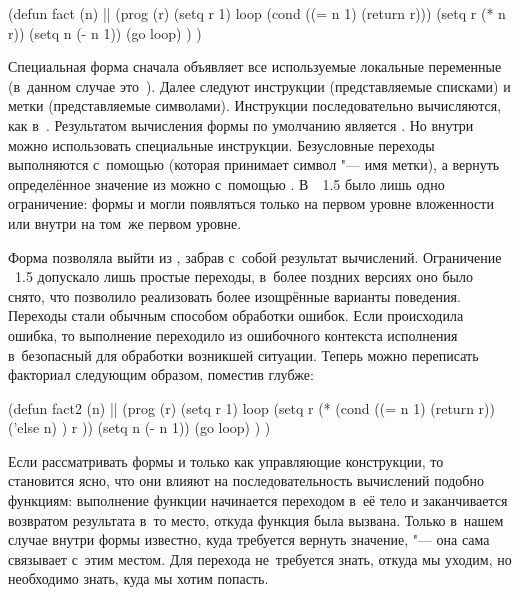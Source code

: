 \begin{code:lisp}
(defun fact (n)     |\dialect{\CommonLisp}|
  (prog (r)
            (setq r 1)
       loop (cond ((= n 1) (return r)))
            (setq r (* n r))
            (setq n (- n 1))
            (go loop) ) )
\end{code:lisp}

Специальная форма  сначала объявляет все используемые локальные
переменные (в~данном случае это~). Далее следуют инструкции
(представляемые списками) и метки (представляемые символами). Инструкции
последовательно вычисляются, как в~. Результатом вычисления формы
 по умолчанию является . Но внутри  можно использовать
специальные инструкции. Безусловные переходы выполняются с~помощью 
(которая принимает символ "--- имя метки), а вернуть определённое значение из
 можно с~помощью . В~\LISP~1.5 было лишь одно ограничение:
формы  и  могли появляться только на первом уровне вложенности
или внутри  на том~же первом уровне.

Форма  позволяла выйти из , забрав с~собой результат
вычислений. Ограничение \LISP~1.5 допускало лишь простые переходы, в~более
поздних версиях оно было снято, что позволило реализовать более изощрённые
варианты поведения. Переходы стали обычным способом обработки ошибок. Если
происходила ошибка, то выполнение переходило из ошибочного контекста исполнения
в~безопасный для обработки возникшей ситуации. Теперь можно переписать факториал
следующим образом, поместив  глубже:

\begin{code:lisp}
(defun fact2 (n)     |\dialect{\CommonLisp}|
  (prog (r)
            (setq r 1)
       loop (setq r (* (cond ((= n 1) (return r))
                             ('else n) )
                       r ))
            (setq n (- n 1))
            (go loop) ) )
\end{code:lisp}

Если рассматривать формы  и  только как управляющие
конструкции, то становится ясно, что они влияют на последовательность вычислений
подобно функциям: выполнение функции начинается переходом в~её тело и
заканчивается возвратом результата в~то место, откуда функция была вызвана.
Только в~нашем случае внутри формы  известно, куда требуется вернуть
значение, "--- она сама связывает  с~этим местом. Для перехода
не~требуется знать, откуда мы уходим, но необходимо знать, куда мы хотим
попасть.

